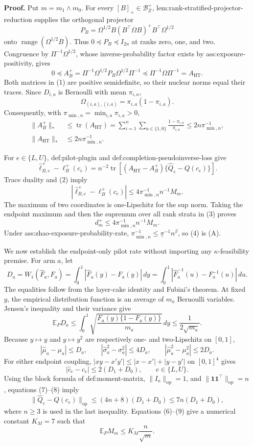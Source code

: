 \textbf{Proof.}
Put \(m=m_1\wedge m_0\).  For every \([B]_+\in\mathcal B_Z^+\), lem:rank-stratified-projector-reduction supplies the orthogonal projector
\[
P_B=\Omega^{1/2}B(B^{\top}\Omega B)^+B^{\top}\Omega^{1/2}
\]
onto \(\operatorname{range}(\Omega^{1/2}B)\).  Thus \(0\preceq P_B\preceq I_{2n}\) at ranks zero, one, and two.  Congruence by \(\Pi^{-1}\Omega^{1/2}\), whose inverse-probability factor exists by ass:exposure-positivity, gives
\[
0\preceq
A_B^+=\Pi^{-1}\Omega^{1/2}P_B\Omega^{1/2}\Pi^{-1}
\preceq
\Pi^{-1}\Omega\Pi^{-1}=A_{\mathrm{HT}}.
\tag{1}
\]
Both matrices in (1) are positive semidefinite, so their nuclear norms equal their traces.  Since \(D_{i,a}\) is Bernoulli with mean \(\pi_{i,a}\),
\[
\Omega_{(i,a),(i,a)}=\pi_{i,a}(1-\pi_{i,a}).
\]
Consequently, with \(\pi_{\min,n}=\min_{i,a}\pi_{i,a}>0\),
\[
\begin{aligned}
\lVert A_B^+\rVert_*
&\le \operatorname{tr}(A_{\mathrm{HT}})
=\sum_{i=1}^n\sum_{a\in\{1,0\}}
\frac{1-\pi_{i,a}}{\pi_{i,a}}
\le2n\pi_{\min,n}^{-1},\\
\lVert A_{\mathrm{HT}}\rVert_*
&\le2n\pi_{\min,n}^{-1}.
\end{aligned}
\tag{2}
\]

For \(e\in\{L,U\}\), def:pilot-plugin and def:completion-pseudoinverse-loss give
\[
\widehat\ell_{B,e}^+-\ell_B^+(c_e)
=n^{-2}\operatorname{tr}\!\left[
(A_{\mathrm{HT}}-A_B^+)\{\widehat Q_e-Q(c_e)\}
\right].
\]
Trace duality and (2) imply
\[
\left|\widehat\ell_{B,e}^+-\ell_B^+(c_e)\right|
\le4\pi_{\min,n}^{-1}n^{-1}M_m.
\tag{3}
\]
The maximum of two coordinates is one-Lipschitz for the sup norm.  Taking the endpoint maximum and then the supremum over all rank strata in (3) proves
\[
d_m^+\le4\pi_{\min,n}^{-1}n^{-1}M_m.
\tag{4}
\]
Under ass:zhao-exposure-probability-rate, \(\pi_{\min,n}^{-1}\le\underline\pi^{-1}n^\beta\), so (4) is (A).

We now establish the endpoint-only pilot rate without importing any \(\kappa\)-feasibility premise.  For arm \(a\), let
\[
D_a=W_1(\widehat F_a,F_a)
=\int_0^1|\widehat F_a(y)-F_a(y)|\,dy
=\int_0^1|\widehat F_a^{-1}(u)-F_a^{-1}(u)|\,du.
\tag{5}
\]
The equalities follow from the layer-cake identity and Fubini's theorem.  At fixed \(y\), the empirical distribution function is an average of \(m_a\) Bernoulli variables.  Jensen's inequality and their variance give
\[
\mathbb E_PD_a
\le\int_0^1
\sqrt{\frac{F_a(y)\{1-F_a(y)\}}{m_a}}\,dy
\le\frac1{2\sqrt{m_a}}.
\tag{6}
\]
Because \(y\mapsto y\) and \(y\mapsto y^2\) are respectively one- and two-Lipschitz on \([0,1]\),
\[
|\widehat\mu_a-\mu_a|\le D_a,
\qquad
|\widehat\sigma_a^2-\sigma_a^2|\le4D_a,
\qquad
|\widehat\mu_a^2-\mu_a^2|\le2D_a.
\tag{7}
\]
For either endpoint coupling, \(|xy-x'y'|\le|x-x'|+|y-y'|\) on \([0,1]^4\) gives
\[
|\widehat c_e-c_e|\le2(D_1+D_0),
\qquad e\in\{L,U\}.
\tag{8}
\]
Using the block formula of def:moment-matrix, \(\lVert I_n\rVert_{\mathrm{op}}=1\), and \(\lVert\mathbf1\mathbf1^{\top}\rVert_{\mathrm{op}}=n\), equations (7)--(8) imply
\[
\lVert\widehat Q_e-Q(c_e)\rVert_{\mathrm{op}}
\le(4n+8)(D_1+D_0)
\le7n(D_1+D_0),
\tag{9}
\]
where \(n\ge3\) is used in the last inequality.  Equations (6)--(9) give a numerical constant \(K_M=7\) such that
\[
\mathbb E_PM_m\le K_M\frac{n}{\sqrt m}.
\tag{10}
\]

